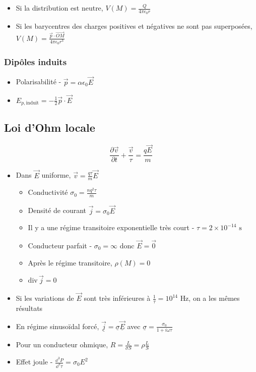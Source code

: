 \documentclass[openany]{book}
\begin{document}
\begin{itemize}
    \item Si la distribution est neutre, $V(M) = \frac{Q}{4\pi\epsilon_0r}$
    \item Si les barycentres des charges positives et négatives ne sont pas superposées, $V(M) = \frac{\vec{p}\cdot\overrightarrow{OM}}{4\pi\epsilon_0r^3}$
\end{itemize}

\subsubsection{Dipôles induits}

\begin{itemize}
    \item Polarisabilité - $\vec{p} = \alpha \epsilon_0 \vec{E}$
    \item $E_{p,\text{induit}} = -\frac{1}{2}\vec{p}\cdot\vec{E}$
\end{itemize}

\subsection{Loi d'Ohm locale}

\[ \frac{\partial \vec{v}}{\partial t} + \frac{\vec{v}}{\tau} = \frac{q \vec{E}}{m} \]

\begin{itemize}
    \item Dans $\vec{E}$ uniforme, $\vec{v} = \frac{q \tau}{m} \vec{E}$ 
    \begin{itemize}
        \item Conductivité $\sigma_0 = \frac{nq^2\tau}{m}$
        \item Densité de courant $\vec{j} = \sigma_0\vec{E}$
        \item Il y a une régime transitoire exponentielle très court - $\tau = 2 \times 10^{-14} \text{ s}$
        \item Conducteur parfait - $\sigma_0 = \infty$ donc $\vec{E} = \vec{0}$
        \item Après le régime transitoire, $\rho(M) = 0$
        \item $\text{div} \, \vec{j} = 0$
    \end{itemize}
    \item Si les variations de $\vec{E}$ sont très inférieures à $\frac{1}{\tau} = 10^{14} \text{ Hz}$, on a les mêmes résultats
    \item En régime sinusoïdal forcé, $\underline{\vec{j}} = \underline{\sigma}\underline{\vec{E}}$ avec $\underline{\sigma} = \frac{\sigma_0}{1+i\omega\tau}$
    \item Pour un conducteur ohmique, $R = \frac{L}{\sigma S} = \rho \frac{L}{S}$
    \item Effet joule - $\frac{\dd^3 P}{\dd^3 \tau} = \sigma_0 E^2$
\end{itemize}
\end{document}
